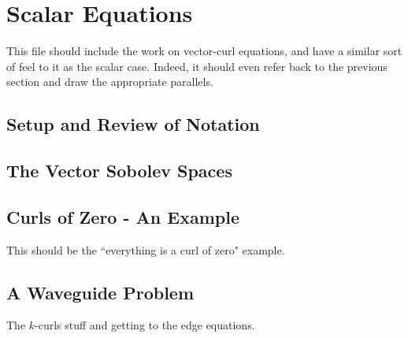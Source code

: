 \chapter{Scalar Equations} \label{ch:3VectorEqns}
This file should include the work on vector-curl equations, and have a similar sort of feel to it as the scalar case. Indeed, it should even refer back to the previous section and draw the appropriate parallels.

\section{Setup and Review of Notation}

\section{The Vector Sobolev Spaces}

\section{Curls of Zero - An Example}
This should be the ``everything is a curl of zero" example.

\section{A Waveguide Problem}
The $k$-curls stuff and getting to the edge equations.